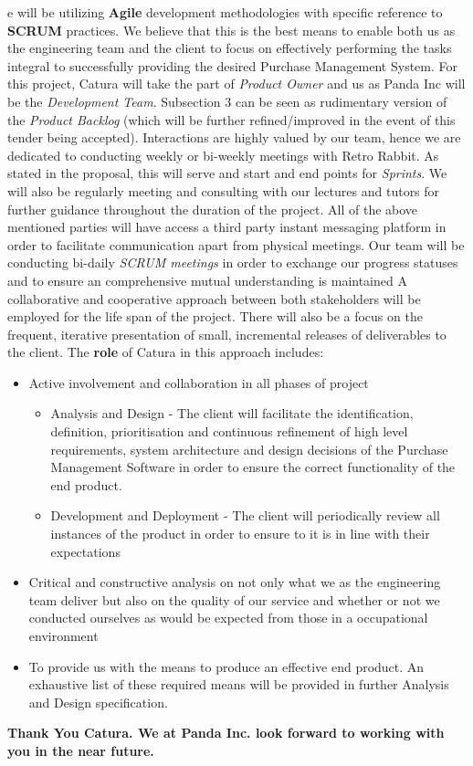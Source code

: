 \documentclass[11pt]{article}
\begin{document}
e will be utilizing \textbf{Agile} development methodologies with specific reference to \textbf{SCRUM} practices. We believe that this is the best means to enable both us as the engineering team and the client to focus on effectively performing the tasks integral to successfully providing the desired Purchase Management System. 
For this project, Catura will take the part of \emph{Product Owner} and us as Panda Inc will be the \emph{Development Team}. Subsection 3 can be seen as rudimentary version of the \emph{Product Backlog} (which will be further refined/improved in the event of this tender being accepted).
\newline \newline
Interactions are highly valued by our team, hence we are dedicated to conducting weekly or bi-weekly meetings with Retro Rabbit. As stated in the proposal, this will serve and start and end points for \emph{Sprints}. We will also be regularly meeting and consulting with our lectures and tutors for further guidance throughout the duration of the project. All of the above mentioned parties will have access a third party instant messaging platform in order to facilitate communication apart from physical meetings. Our team will be conducting bi-daily \emph{SCRUM meetings} in order to exchange our progress statuses and to ensure an comprehensive mutual understanding is maintained
\newline \newline
A collaborative and cooperative approach between both stakeholders will be employed for the life span of the project. There will also be a focus on the frequent, iterative presentation of small, incremental releases of deliverables to the client. The \textbf{role} of Catura in this approach includes:
\begin{itemize}
\item Active involvement and collaboration in all phases of project
  \begin{itemize}
  \item Analysis and Design - The client will facilitate the identification, definition, prioritisation and continuous refinement of high level requirements, system architecture and design decisions of the Purchase Management Software in order to ensure the correct functionality of the end product.
  \item Development and Deployment - The client will periodically review all instances of the product in order to ensure to it is in line with their expectations 
  \end{itemize}
\item Critical and constructive analysis on not only what we as the engineering team deliver but also on the quality of our service and whether or not we conducted ourselves as would be expected from those in a occupational environment
\item To provide us with the means to produce an effective end product. An exhaustive list of these required means will be provided in further Analysis and Design specification.
  
\end{itemize}
\begin{center}
{\sffamily\bfseries
\large Thank You Catura. We at Panda Inc. look forward to working with you in the near future.
}
\end{center}
\end{document}
